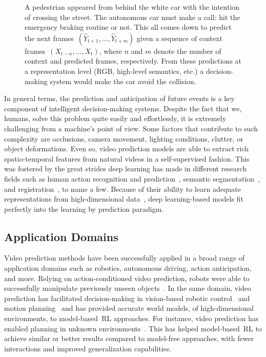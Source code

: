 \begin{figure}[!hbt]
	\centering
	\resizebox{0.75\textwidth}{!}{
		}
	\caption{A pedestrian appeared from behind the white car with the intention of crossing the street. The autonomous car must make a call: hit the emergency braking routine or not. This all comes down to predict the next frames~$(\hat{Y}_{t+1},\ldots,\hat{Y}_{t+m})$ given a sequence of context frames~$(X_{t-n}, \ldots, X_{t})$, where $n$ and $m$ denote the number of context and predicted frames, respectively. From these predictions at a representation level (\acs{RGB}, high-level semantics, etc.) a decision-making system would make the car avoid the collision.}
	\label{fig:pedestrian}
\end{figure}

In general terms, the prediction and anticipation of future events is a key component of intelligent decision-making systems. Despite the fact that we, humans, solve this problem quite easily and effortlessly,
it is extremely challenging from a machine's point of view.
Some factors that contribute to such complexity are occlusions, camera movement, lighting conditions, clutter, or object deformations. Even so, video prediction models are able to extract rich spatio-temporal features from natural videos in a self-supervised fashion. This was fostered by the great strides deep learning has made in different research fields such as human action recognition and prediction~\cite{Kong2018}, semantic segmentation~\cite{Garcia2018a}, and registration~\cite{Villena2020}, to name a few. Because of their ability to learn adequate representations from high-dimensional data~\cite{LeCun2015}, deep learning-based models fit perfectly into the learning by prediction paradigm.

\subsection{Application Domains}
Video prediction methods have been successfully applied in a broad range of application domains such as robotics, autonomous driving, action anticipation, and more. Relying on action-conditioned video prediction, robots were able to successfully manipulate previously unseen objects~\cite{Finn2016}. In the same domain, video prediction has facilitated decision-making in vision-based robotic control~\cite{Ebert2018} and motion planning~\cite{Koppula2016,Xie2019} and has provided accurate world models, of high-dimensional environments, to model-based~\ac{RL} approaches. For instance, video prediction has enabled planning in unknown environments~\cite{Hafner2019,Kaiser2020}. This has helped model-based~\ac{RL} to achieve similar or better results compared to model-free approaches, with fewer interactions and improved generalization capabilities.

